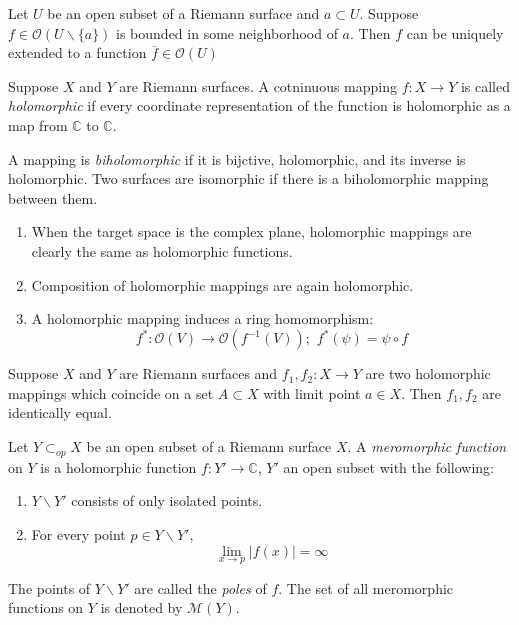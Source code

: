 \begin{thm}

Let $U$ be an open subset of a Riemann surface and $a \subset U$. Suppose $f \in \mathcal{O}(U \backslash \{a\})$ is bounded in some neighborhood of $a$. Then $f$ can be uniquely extended to a function $\overline{f} \in \mathcal{O}(U)$

\end{thm}

\begin{defn}

Suppose $X$ and $Y$ are Riemann surfaces. A cotninuous mapping $f:X \to Y$ is called \textit{holomorphic} if every coordinate representation of the function is holomorphic as a map from $\mathbb{C}$ to $\mathbb{C}$. \smallskip

A mapping is \textit{biholomorphic} if it is bijctive, holomorphic, and its inverse is holomorphic. Two surfaces are isomorphic if  there is a biholomorphic mapping between them.

\end{defn}

\begin{rmk}

\begin{enumerate}
    \item When the target space is the complex plane, holomorphic mappings are clearly the same as holomorphic functions.
    \item Composition of holomorphic mappings are again holomorphic.
    \item A holomorphic mapping induces a ring homomorphism:
    \[f^*: \mathcal{O}(V) \to \mathcal{O}(f^{-1}(V)); \hspace{4pt} f^*(\psi) = \psi \circ f\]
\end{enumerate}

\end{rmk}

\begin{thm}

Suppose $X$ and $Y$ are Riemann surfaces and $f_1, f_2: X \to Y$ are two holomorphic mappings which coincide on a set $A \subset X$ with limit point $a \in X$. Then $f_1, f_2$ are identically equal.
\end{thm}

\begin{thm}

Let $Y \subset_{op} X$ be an open subset of a Riemann surface $X$. A \textit{meromorphic function} on $Y$ is a holomorphic function $f: Y' \to \mathbb{C}$, $Y'$ an open subset with the following:

\begin{enumerate}
    \item $Y\backslash Y'$ consists of only isolated points.
    \item For every point $p \in Y\backslash Y'$, 
    \[\lim_{x \to p} \vert f(x) \vert = \infty    \]
\end{enumerate}

The points of $Y \backslash Y'$ are called the \textit{poles} of $f$. The set of all meromorphic functions on $Y$ is denoted by $\mathcal{M}(Y)$. 
\end{thm}

